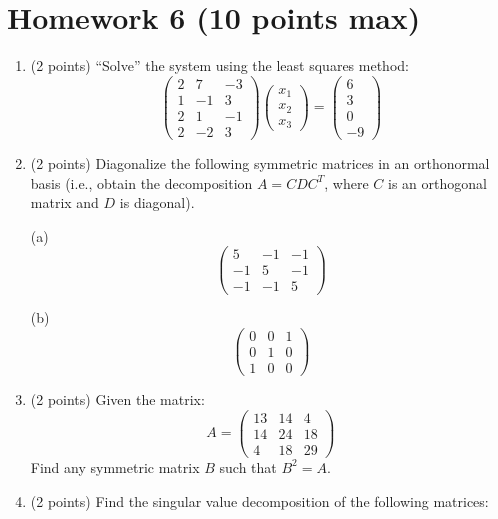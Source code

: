 \documentclass{article}
\begin{document}
\section*{Homework 6 (10 points max)}

\begin{enumerate}
  \item (2 points) ``Solve'' the system using the least squares method:
  \[
  \begin{pmatrix}
  2 & 7 & -3 \\
  1 & -1 & 3 \\
  2 & 1 & -1 \\
  2 & -2 & 3
  \end{pmatrix}
  \begin{pmatrix}
  x_1 \\
  x_2 \\
  x_3
  \end{pmatrix}
  =
  \begin{pmatrix}
  6 \\
  3 \\
  0 \\
  -9
  \end{pmatrix}
  \]
  
  \item (2 points) Diagonalize the following symmetric matrices in an orthonormal basis (i.e., obtain the decomposition $A = CDC^T$, where $C$ is an orthogonal matrix and $D$ is diagonal).
  
  (a)
  \[
  \begin{pmatrix}
  5 & -1 & -1 \\
  -1 & 5 & -1 \\
  -1 & -1 & 5
  \end{pmatrix}
  \]
  
  (b)
  \[
  \begin{pmatrix}
  0 & 0 & 1 \\
  0 & 1 & 0 \\
  1 & 0 & 0
  \end{pmatrix}
  \]
  
  \item (2 points) Given the matrix:
  \[
  A =
  \begin{pmatrix}
  13 & 14 & 4 \\
  14 & 24 & 18 \\
  4 & 18 & 29
  \end{pmatrix}
  \]
  Find any symmetric matrix $B$ such that $B^2 = A$.
  
  \item (2 points) Find the singular value decomposition of the following matrices:
  

\end{enumerate}
\end{document}
